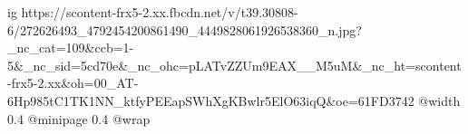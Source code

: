  
 
 
 
 

\ifcmt
  ig https://scontent-frx5-2.xx.fbcdn.net/v/t39.30808-6/272626493_4792454200861490_4449828061926538360_n.jpg?_nc_cat=109&ccb=1-5&_nc_sid=5cd70e&_nc_ohc=pLATvZZUm9EAX__M5uM&_nc_ht=scontent-frx5-2.xx&oh=00_AT-6Hp985tC1TK1NN_ktfyPEEapSWhXgKBwlr5ElO63iqQ&oe=61FD3742
  @width 0.4
  @minipage 0.4
  @wrap \parpic[l]
\fi
